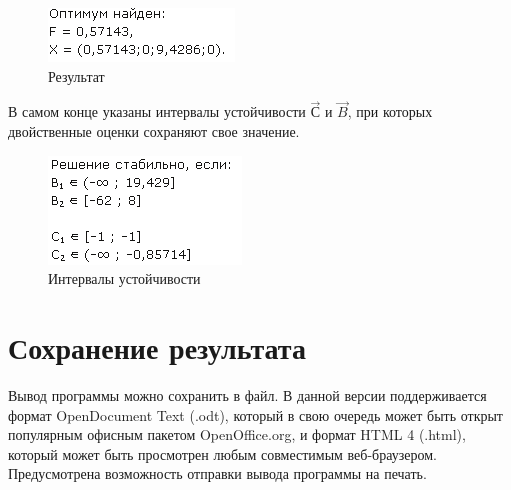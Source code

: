 \newpage
\clearpage

\begin{figure}[ht]
\centering
\includegraphics[scale=1.0]{img/result.png}
\caption{Результат}
\end{figure}

В самом конце указаны интервалы устойчивости $\vec{С}$ и $\vec{B}$, при которых двойственные оценки сохраняют свое значение.
\begin{figure}[hb]
\centering
\includegraphics[scale=1.0]{img/stability.png}
\caption{Интервалы устойчивости}
\end{figure}

\section{Сохранение результата}
Вывод программы можно сохранить в файл. В данной версии поддерживается формат OpenDocument Text (.odt), который в свою очередь может быть открыт популярным офисным пакетом OpenOffice.org, и формат HTML 4 (.html), который может быть просмотрен любым совместимым веб-браузером. Предусмотрена возможность отправки вывода программы на печать.
